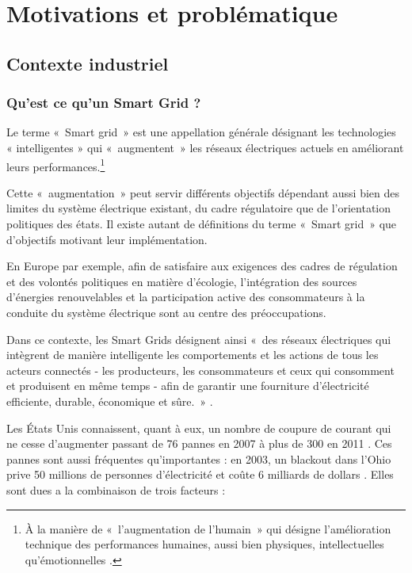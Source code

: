 \chapter{Motivations et problématique}
\label{chap:problematique}

\section{Contexte industriel}

\subsection{Qu'est ce qu'un Smart Grid ?}
Le terme «~Smart grid~» est une appellation générale désignant les technologies 
« intelligentes » qui «~augmentent~» les réseaux électriques actuels en 
améliorant leurs performances.\footnote{À la manière de «~l'augmentation de 
l'humain~» qui désigne l'amélioration technique des performances humaines, aussi 
bien physiques, intellectuelles qu'émotionnelles \cite{le2013humain}.}

Cette «~augmentation~» peut servir différents objectifs dépendant aussi bien des 
limites du système électrique existant, du cadre régulatoire que de 
l'orientation politiques des états. Il existe autant de définitions du terme 
«~Smart grid~» que d'objectifs motivant leur implémentation.

En Europe par exemple, afin de satisfaire aux exigences des cadres de 
régulation et des volontés politiques en matière d'écologie, l'intégration des 
sources d’énergies renouvelables et la participation active des consommateurs 
à la conduite du système électrique sont au centre des préoccupations.

Dans ce contexte, les Smart Grids désignent ainsi «~des réseaux électriques qui 
intègrent de manière intelligente les comportements et les actions de tous les 
acteurs connectés - les producteurs, les consommateurs et ceux qui consomment 
et produisent en même temps - afin de garantir une fourniture d'électricité 
efficiente, durable, économique et sûre.~» \cite{ETP}.

Les États Unis connaissent, quant à eux, un nombre de coupure de courant qui ne 
cesse d'augmenter passant de 76 pannes en 2007 à plus de 300 en 2011 
\cite{detroit}. Ces pannes sont aussi fréquentes qu'importantes : en 2003, un 
blackout dans l'Ohio prive 50 millions de personnes d'électricité et coûte 6 
milliards de dollars \cite{andersson2005causes}. Elles sont dues a la 
combinaison de trois facteurs \cite{outages}:

